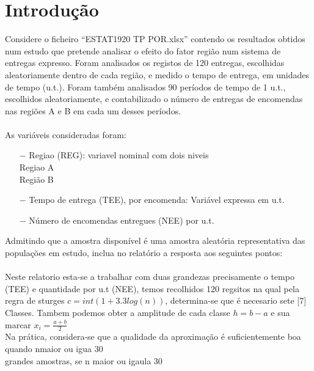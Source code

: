 \section{Introdução}\label{Introdução}
%
Considere o ficheiro “ESTAT1920 TP POR.xlsx” contendo os resultados obtidos num estudo que
pretende analisar o efeito do fator região num sistema de entregas expresso. Foram analisados
os registos de 120 entregas, escolhidas aleatoriamente dentro de cada região, e medido o tempo
de entrega, em unidades de tempo (u.t.). Foram também analisados 90 períodos de tempo de 1
u.t., escolhidos aleatoriamente, e contabilizado o número de entregas de encomendas nas
regiões A e B em cada um desses períodos.\\
\\
As variáveis consideradas foram:
\begin{itemize}
\item[$-$] Regiao (REG): variavel nominal com dois niveis\\
\qquad Regiao A \\
\qquad Região B
\item [$-$] Tempo de entrega (TEE), por encomenda: Variável expressa em u.t.
\item [$-$] Número de encomendas entregues (NEE) por u.t.
\end{itemize}
Admitindo que a amostra disponível é uma amostra aleatória representativa das populações em
estudo, inclua no relatório a resposta aos seguintes pontos:\\
\\
Neste relatorio esta-se a trabalhar com duas  grandezas precisamente o tempo (TEE) e quantidade por u.t (NEE), temos recolhidos 120 regsitos na qual pela regra de sturges $c = int(1+3.3log(n))$, determina-se que é necesario sete [7] Classes.
Tambem podemos obter a amplitude de cada classe $h=b-a$ e sua marcar $x_i=\frac{a+b}{2}$ \\
Na prática, considera-se que a qualidade da aproximação é suficientemente boa quando nmaior ou igua 30 \\
grandes amostras, se n maior ou igaula 30 \\
\\
